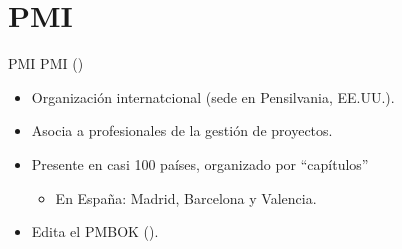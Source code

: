 \section{PMI}
\begin{frame}{PMI}
	PMI ()
	\begin{itemize}
		\item Organización internatcional (sede en Pensilvania, EE.UU.).
		\item Asocia a profesionales de la gestión de proyectos.
		\item Presente en casi 100 países, organizado por ``capítulos''
		\begin{itemize}
			\item En España: Madrid, Barcelona y Valencia.
		\end{itemize}
		\item Edita el PMBOK ().
	\end{itemize}
\end{frame}

